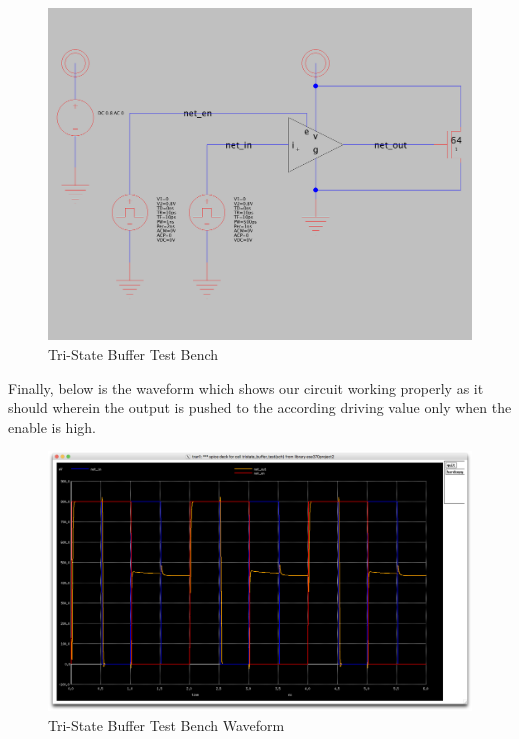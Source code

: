 \documentclass[a4paper]{article}
\begin{document}
\begin{figure}[H]
	\centering
	\includegraphics[scale=0.15]{triBufTest}
	\caption{Tri-State Buffer Test Bench}
	\label{fig:triBufTest}
\end{figure}

Finally, below is the waveform which shows our circuit working properly as it should wherein the output is pushed to the according driving value only when the enable is high.

\begin{figure}[H]
	\centering
	\includegraphics[scale=0.15]{triBufWave}
	\caption{Tri-State Buffer Test Bench Waveform}
	\label{fig:triBufWave}
\end{figure}
\end{document}

